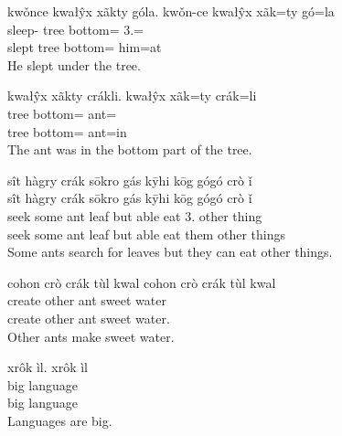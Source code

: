 \documentclass[12pt]{article}
\begin{document}
    \begin{exe}
        \ex
        kwǒnce kwałŷx xãkty góla.
        \glll
        kwǒn-ce kwałŷx xãk=ty gó=la \\
        sleep-\Pst{} tree bottom=\Poss{} 3\Sg{}.\Anim{}=\AdessThree{} \\
        slept tree bottom=\Poss{} him=at \\
        \glt
        He slept under the tree.
    \end{exe}

    \begin{exe}
        \ex
        kwałŷx xãkty crákli.
        \glll
        kwałŷx xãk=ty crák=li \\
        tree bottom=\Poss{} ant=\InessThree{} \\
        tree bottom=\Poss{} ant=in \\
        \glt
        The ant was in the bottom part of the tree.
    \end{exe}

    \begin{exe}
        \ex
        sît hàgry crák sōkro gás kȳhi kōg gógó crò ǐ \\
        \glll
        sît hàgry crák sōkro gás kȳhi kōg gógó crò ǐ \\
        seek some ant leaf but able eat 3\Pl{}.\Anim{} other thing \\
        seek some ant leaf but able eat them other things \\
        \glt
        Some ants search for leaves but they can eat other things.
    \end{exe}

    \begin{exe}
        \ex
        cohon crò crák tùl kwal
        \glll
        cohon crò crák tùl kwal \\
        create other ant sweet water \\
        create other ant sweet water. \\
        \glt
        Other ants make sweet water.
    \end{exe}

    \begin{exe}
        \ex
        xrôk ìl.
        \glll
        xrôk ìl \\
        big language \\
        big language \\
        \glt
        Languages are big.
    \end{exe}
\end{document}
